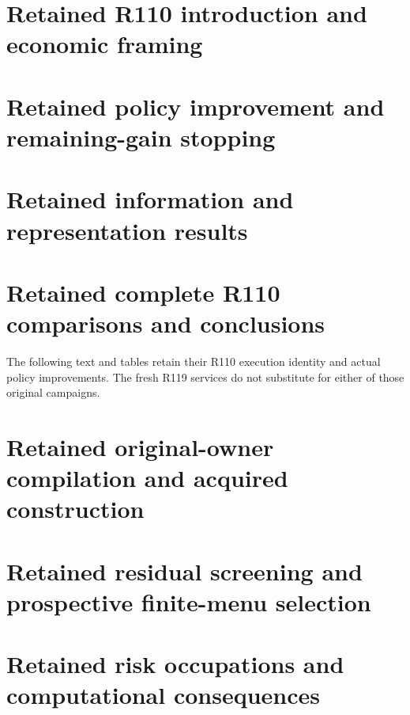 \documentclass[ecta,nameyear,draft]{econsocart}
\begin{document}
\section{Retained R110 introduction and economic framing}\label{dev:intro110}

\section{Retained policy improvement and remaining-gain stopping}


\section{Retained information and representation results}



\section{Retained complete R110 comparisons and conclusions}\label{dev:custody110}
The following text and tables retain their R110 execution identity and actual
policy improvements. The fresh R119 services do not substitute for either
of those original campaigns.



\section{Retained original-owner compilation and acquired construction}\label{dev:core110}

\section{Retained residual screening and prospective finite-menu selection}\label{dev:selection110}










\section{Retained risk occupations and computational consequences}\label{sec:riskextensions99}

\end{document}
